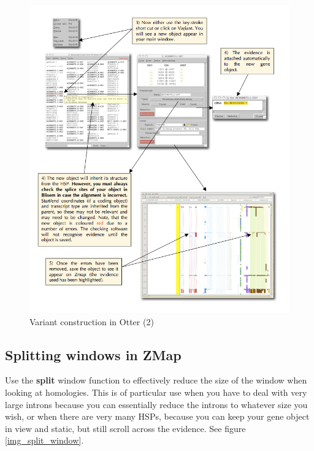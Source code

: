 \documentclass[letterpaper]{article}
\begin{document}
\begin{figure}
\centering
\color[rgb]{0.30980393,0.5058824,0.7411765}
\includegraphics[width=15.231cm]{img_variant_construction2.png}
\caption{Variant construction in Otter (2)}
\label{img_variant_construction2}
\end{figure}

\subsection{Splitting windows in ZMap}
Use the \textbf{split} window function to effectively reduce the size of the window when looking at homologies. This is of particular use when you have to deal with very large introns because you can essentially reduce the introns to whatever size you wish, or when there are very many HSPs, because you can keep your gene object in view and static, but still scroll across the evidence. See figure \ref{img_split_window}.
\end{document}
